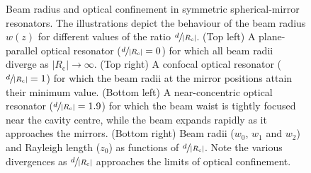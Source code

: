 \documentclass[../Thesis-IJspeert.tex]{subfiles}
\begin{document}
\begin{figure}[t]
\caption[Beam radius and optical confinement in symmetric spherical-mirror resonators]{Beam radius and optical confinement in symmetric spherical-mirror resonators. The illustrations depict the behaviour of the beam radius $w(z)$ for different values of the ratio $\sfrac{d}{\lvert R_\mathrm{c} \rvert}$. (Top left) A plane-parallel optical resonator ($\sfrac{d}{\lvert R_\mathrm{c} \rvert} = 0$) for which all beam radii diverge as $\lvert R_\mathrm{c} \vert \rightarrow \infty$. (Top right) A confocal optical resonator ($\sfrac{d}{\lvert R_\mathrm{c} \rvert} = 1$) for which the beam radii at the mirror positions attain their minimum value. (Bottom left) A near-concentric optical resonator ($\sfrac{d}{\lvert R_\mathrm{c} \rvert} = 1.9$) for which the beam waist is tightly focused near the cavity centre, while the beam expands rapidly as it approaches the mirrors. (Bottom right) Beam radii ($w_0$, $w_1$ and $w_2$) and Rayleigh length ($z_0$) as functions of $\sfrac{d}{\lvert R_\mathrm{c} \rvert}$. Note the various divergences as $\sfrac{d}{\lvert R_\mathrm{c} \rvert}$ approaches the limits of optical confinement.}
\label{beamradiusincavity} 
\end{figure}
\end{document}
